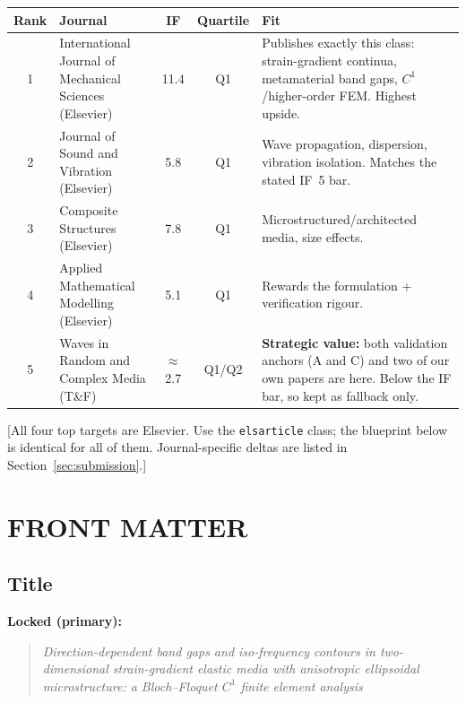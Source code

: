\documentclass[11pt,a4paper]{article}
\newcommand{\bp}[1]{\textcolor{accent}{\textsf{\footnotesize [#1]}}}
\begin{document}
{\small
\begin{tabularx}{\textwidth}{@{}c L{3.6cm} c c Y@{}}
\toprule
Rank & Journal & IF & Quartile & Fit \\
\midrule
{}1 & International Journal of Mechanical Sciences (Elsevier) & 11.4 & Q1 & Publishes exactly this class: strain-gradient continua, metamaterial band gaps, $C^1$/higher-order FEM. Highest upside. \\
2 & Journal of Sound and Vibration (Elsevier) & 5.8 & Q1 & Wave propagation, dispersion, vibration isolation. Matches the stated IF~5 bar. \\
3 & Composite Structures (Elsevier) & 7.8 & Q1 & Microstructured/architected media, size effects. \\
4 & Applied Mathematical Modelling (Elsevier) & 5.1 & Q1 & Rewards the formulation + verification rigour. \\
5 & Waves in Random and Complex Media (T\&F) & $\approx$2.7 & Q1/Q2 & \textbf{Strategic value:} both validation anchors (A and C) and two of our own papers are here. Below the IF bar, so kept as fallback only. \\
\bottomrule
\end{tabularx}
}

\medskip
\bp{All four top targets are Elsevier. Use the \texttt{elsarticle} class; the blueprint below is identical for all of them. Journal-specific deltas are listed in Section~\ref{sec:submission}.}

\newpage
\section{FRONT MATTER}

\subsection{Title}

\textbf{Locked (primary):}
\begin{quote}\itshape
Direction-dependent band gaps and iso-frequency contours in two-dimensional
strain-gradient elastic media with anisotropic ellipsoidal microstructure:
a Bloch--Floquet $C^1$ finite element analysis
\end{quote}
\end{document}
